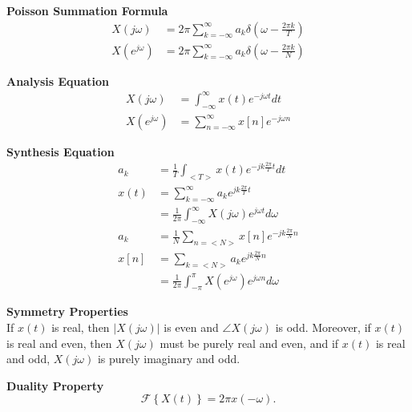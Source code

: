 \documentclass[8pt]{article}
\begin{document}
\begin{multicols}{2}

    \noindent\textbf{Poisson Summation Formula}
    \begin{align} \label{eq:poisson}
        X(j\omega)     & = 2\pi\sum_{k=-\infty}^{\infty} a_k \delta\left( \omega - \frac{2\pi k}{T} \right) \\
        X(e^{j\omega}) & = 2\pi\sum_{k=-\infty}^{\infty} a_k \delta\left( \omega - \frac{2\pi k}{N} \right)
    \end{align}

    \noindent\textbf{Analysis Equation}
    \begin{align} \label{eq:analysis}
        X(j\omega)     & = \int_{-\infty}^{\infty} x(t) e^{-j\omega t} dt \\
        X(e^{j\omega}) & = \sum_{n=-\infty}^{\infty} x[n] e^{-j\omega n}
    \end{align}

    \noindent\textbf{Synthesis Equation}
    \begin{align} \label{eq:synthesis}
        a_k  & = \frac{1}{T} \int_{<T>} x(t) e^{-jk\frac{2\pi}{T} t} dt                  \\
        x(t) & = \sum_{k=-\infty}^{\infty} a_k e^{jk\frac{2\pi}{T} t}                    \\
             & = \frac{1}{2\pi} \int_{-\infty}^{\infty} X(j\omega) e^{j\omega t} d\omega \\
        a_k  & = \frac{1}{N} \sum_{n=<N>} x[n] e^{-jk\frac{2\pi}{N}n}                    \\
        x[n] & = \sum_{k=<N>} a_k e^{jk\frac{2\pi}{N} n}                                 \\
             & = \frac{1}{2\pi} \int_{-\pi}^{\pi} X(e^{j\omega}) e^{j\omega n} d\omega
    \end{align}

    \noindent\textbf{Symmetry Properties} \\
    If $x(t)$ is real, then $|X(j\omega)|$ is even and
    $\angle X(j\omega)$ is odd. Moreover, if $x(t)$ is real
    and even, then $X(j\omega)$ must be purely real and even,
    and if $x(t)$ is real and odd, $X(j\omega)$ is purely
    imaginary and odd.

    \noindent\textbf{Duality Property}
    \begin{equation} \label{eq:duality}
        \mathcal{F}\left\{ X(t) \right\} = 2\pi x(-\omega).
    \end{equation}


\end{multicols}
\end{document}
